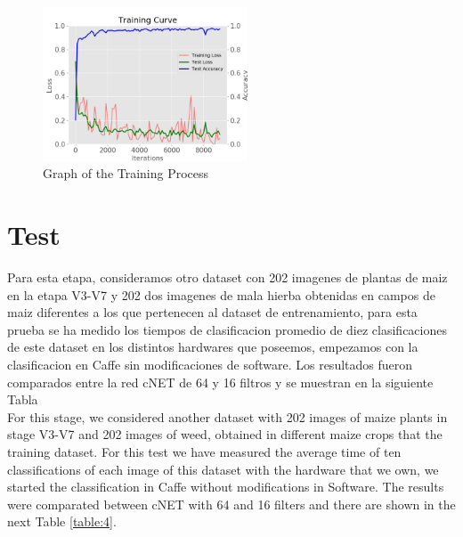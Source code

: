 \documentclass[conference]{IEEEtran}
\begin{document}
	\begin{figure}[h]
	\centering
	\includegraphics[width=2.4in]{entrenamiento}
	\caption{ Graph of the Training Process }
	\label{fig_sim}
	\end{figure}
	
\section{Test}

Para esta etapa, consideramos otro dataset con 202 imagenes de plantas de maiz en la etapa V3-V7 y 202 dos imagenes de mala hierba obtenidas en campos de maiz diferentes a los que pertenecen al dataset de entrenamiento, para esta prueba se ha medido los tiempos de clasificacion promedio de diez clasificaciones de este dataset en los distintos hardwares que poseemos, empezamos con la clasificacion en Caffe sin modificaciones de software. Los resultados fueron comparados entre la red cNET de 64 y 16 filtros y se muestran en la siguiente Tabla\\

For this stage, we considered another dataset with 202 images of maize plants in stage V3-V7 and 202 images of weed, obtained in different maize crops that the training dataset. For this test we have measured the average time of ten classifications of each image of this dataset with the hardware that we own, we started the classification in Caffe without modifications in Software.  The results were comparated between cNET with 64 and 16 filters and there are shown in the next Table \ref{table:4}.\\  
\end{document}
